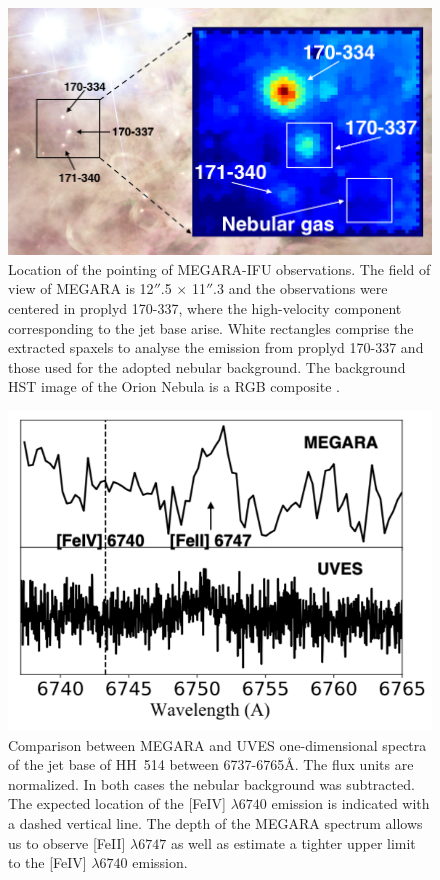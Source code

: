 \documentclass[fleqn,usenatbib]{mnras}
\begin{document}
\begin{figure}
\includegraphics[width=\columnwidth]{MEGARA_IFU.png}
\caption{ Location of the pointing of MEGARA-IFU observations. The field of view of MEGARA is 12$''$.5 $\times$ 11$''$.3 and the observations were centered in proplyd 170-337, where the high-velocity component corresponding to the jet base arise. White rectangles comprise the extracted spaxels to analyse the emission from proplyd 170-337 and those used for the adopted nebular background. The background HST image of the Orion Nebula is a RGB composite  \citep[Red: ACS F658N+F775W+F850LP; Green: ACS F555W; Blue: ACS F435W,][]{Robberto:2013a}.}
\label{fig:megara}
\end{figure}



\begin{figure}
\includegraphics[width=\columnwidth]{megara_UVES.png}
\caption{Comparison between MEGARA and UVES one-dimensional spectra of the jet base of HH~514 between 6737-6765\AA. The flux units are normalized. In both cases the nebular background was subtracted. The expected location of the [Fe\thinspace IV] $\lambda 6740$ emission is indicated with a dashed vertical line. The depth of the MEGARA spectrum allows us to observe [Fe\thinspace II] $\lambda 6747$ as well as estimate a tighter upper limit to the [Fe\thinspace IV] $\lambda 6740$  emission.  }
\label{fig:megara_vs_UVES}
\end{figure}
\end{document}
